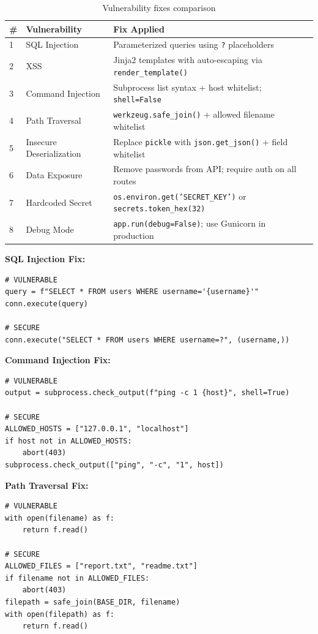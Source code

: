 \documentclass[12pt,a4paper]{report}
\begin{document}
\begin{table}[H]
\centering
\begin{tabularx}{\textwidth}{l X X}
\toprule
\textbf{\#} & \textbf{Vulnerability} & \textbf{Fix Applied} \\
\midrule
1 & SQL Injection & Parameterized queries using \texttt{?} placeholders \\
2 & XSS & Jinja2 templates with auto-escaping via \texttt{render\_template()} \\
3 & Command Injection & Subprocess list syntax + host whitelist; \texttt{shell=False} \\
4 & Path Traversal & \texttt{werkzeug.safe\_join()} + allowed filename whitelist \\
5 & Insecure Deserialization & Replace \texttt{pickle} with \texttt{json.get\_json()} + field whitelist \\
6 & Data Exposure & Remove passwords from API; require auth on all routes \\
7 & Hardcoded Secret & \texttt{os.environ.get('SECRET\_KEY')} or \texttt{secrets.token\_hex(32)} \\
8 & Debug Mode & \texttt{app.run(debug=False)}; use Gunicorn in production \\
\bottomrule
\end{tabularx}
\caption{Vulnerability fixes comparison}
\end{table}

\textbf{SQL Injection Fix:}
\begin{lstlisting}[style=pythonstyle, caption={Vulnerable vs Secure SQL query}]
# VULNERABLE
query = f"SELECT * FROM users WHERE username='{username}'"
conn.execute(query)

# SECURE
conn.execute("SELECT * FROM users WHERE username=?", (username,))
\end{lstlisting}

\textbf{Command Injection Fix:}
\begin{lstlisting}[style=pythonstyle, caption={Vulnerable vs Secure subprocess call}]
# VULNERABLE
output = subprocess.check_output(f"ping -c 1 {host}", shell=True)

# SECURE
ALLOWED_HOSTS = ["127.0.0.1", "localhost"]
if host not in ALLOWED_HOSTS:
    abort(403)
subprocess.check_output(["ping", "-c", "1", host])
\end{lstlisting}

\textbf{Path Traversal Fix:}
\begin{lstlisting}[style=pythonstyle, caption={Vulnerable vs Secure file access}]
# VULNERABLE
with open(filename) as f:
    return f.read()

# SECURE
ALLOWED_FILES = ["report.txt", "readme.txt"]
if filename not in ALLOWED_FILES:
    abort(403)
filepath = safe_join(BASE_DIR, filename)
with open(filepath) as f:
    return f.read()
\end{lstlisting}
\end{document}
